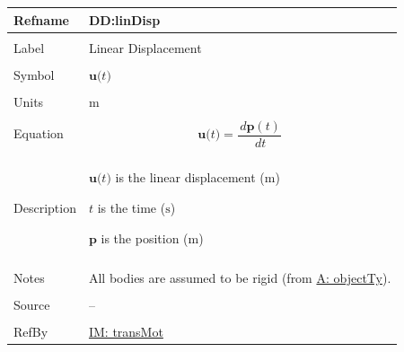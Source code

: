 \documentclass[12pt]{article}
\begin{document}
\vspace{\baselineskip}
\noindent
\begin{minipage}{\textwidth}
\begin{tabular}{>{\raggedright}p{}>{\raggedright\arraybackslash}p{}}
\toprule \textbf{Refname} & \textbf{DD:linDisp}
\label{DD:linDisp}
\\ \midrule \\
Label & Linear Displacement
        
\\ \midrule \\
Symbol & $\mathbf{u}\text{(}t\text{)}$
         
\\ \midrule \\
Units & ${\text{m}}$
        
\\ \midrule \\
Equation & \begin{displaymath}
           \mathbf{u}\text{(}t\text{)}=\frac{\,d\mathbf{p}\left(t\right)}{\,dt}
           \end{displaymath}
\\ \midrule \\
Description & \begin{symbDescription}
              \item{$\mathbf{u}\text{(}t\text{)}$ is the linear displacement (${\text{m}}$)}
              \item{$t$ is the time (${\text{s}}$)}
              \item{$\mathbf{p}$ is the position (${\text{m}}$)}
              \end{symbDescription}
\\ \midrule \\
Notes & All bodies are assumed to be rigid (from \hyperref[assumpOT]{A: objectTy}).
        
\\ \midrule \\
Source & --
         
\\ \midrule \\
RefBy & \hyperref[IM:transMot]{IM: transMot}
        
\\ \bottomrule
\end{tabular}
\end{minipage}
\end{document}
